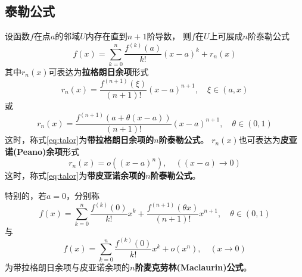 \subsection{泰勒公式}
\begin{theorem}[泰勒(Taylor)公式]
  设函数$f$在点$a$的邻域$U$内存在直到$n+1$阶导数，
  则$f$在$U$上可展成$n$阶泰勒公式
  \begin{equation} \label{eq:talor}
     f(x) = \sum_{k=0}^{n}\frac{f^{(k)}(a)}{k!}(x-a)^k + r_n(x)
  \end{equation}
  其中$r_n(x)$可表达为\textbf{拉格朗日余项}形式
  \begin{displaymath}
    r_n(x)=\frac{f^{(n+1)}(\xi)}{(n+1)!}(x-a)^{n+1},
    \quad \xi\in(a,x)
  \end{displaymath}
  或
  \begin{displaymath}
    r_n(x)=\frac{f^{(n+1)}(a+\theta(x-a))}{(n+1)!}(x-a)^{n+1},
    \quad \theta\in(0,1)
  \end{displaymath}
  这时，称式\eqref{eq:talor}为\textbf{带拉格朗日余项的$n$阶泰勒公式}。
  $r_n(x)$也可表达为\textbf{皮亚诺(Peano)余项}形式
  \begin{displaymath}
    r_n(x)=o\left((x-a)^n\right),\quad((x-a)\to 0)
  \end{displaymath}
  这时，称式\eqref{eq:talor}为\textbf{带皮亚诺余项的$n$阶泰勒公式}。
  
  特别的，若$a=0$，分别称
  \begin{displaymath}
    f(x) = \sum_{k=0}^{n}\frac{f^{(k)}(0)}{k!}x^k
      + \frac{f^{(n+1)}(\theta x)}{(n+1)!}x^{n+1},
      \quad \theta\in (0,1)
  \end{displaymath}
  与
  \begin{displaymath}
    f(x) = \sum_{k=0}^{n}\frac{f^{(k)}(0)}{k!}x^k
      + o(x^n),\quad (x\to 0)
  \end{displaymath}
  为带拉格朗日余项与皮亚诺余项的\textbf{$n$阶麦克劳林(Maclaurin)公式}。
\end{theorem}


